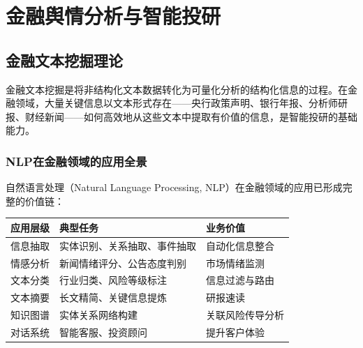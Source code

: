 
\chapter{金融舆情分析与智能投研}

\section{金融文本挖掘理论}

金融文本挖掘是将非结构化文本数据转化为可量化分析的结构化信息的过程。在金融领域，大量关键信息以文本形式存在——央行政策声明、银行年报、分析师研报、财经新闻——如何高效地从这些文本中提取有价值的信息，是智能投研的基础能力。

\subsection{NLP在金融领域的应用全景}

自然语言处理（Natural Language Processing, NLP）在金融领域的应用已形成完整的价值链：

\begin{table}[H]
\centering
\begin{tabular}{lp{4cm}p{5cm}}
\toprule
\textbf{应用层级} & \textbf{典型任务} & \textbf{业务价值} \\
\midrule
信息抽取 & 实体识别、关系抽取、事件抽取 & 自动化信息整合 \\
情感分析 & 新闻情绪评分、公告态度判别 & 市场情绪监测 \\
文本分类 & 行业归类、风险等级标注 & 信息过滤与路由 \\
文本摘要 & 长文精简、关键信息提炼 & 研报速读 \\
知识图谱 & 实体关系网络构建 & 关联风险传导分析 \\
对话系统 & 智能客服、投资顾问 & 提升客户体验 \\
\bottomrule
\end{tabular}
\end{table}

